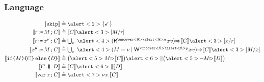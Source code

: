 \documentclass[t,aspectratio=169]{beamer} %
\begin{document}
\begin{frame}
  \frametitle{Language}
  \begin{gather*}
    \begin{aligned}
      \sem[\aThrd]{\SKIP} & \eqdef
      \alert<2>{\{ \DSTOP \}}
      \\
      \sem[\aThrd]{\aReg\GETS\aExp\SEMI \aCmd} & \eqdef
      \sem[\aThrd]{\aCmd}\alert<3>{[\aExp/\aReg]}
      \\ 
      \sem{\aReg\GETS\aLoc^\amode\SEMI \aCmd} & \eqdef \textstyle\bigcup_\aVal\;
      \alert<4>{(\DR[\uncover<8>{\alert<8>{\amode}}]\aLoc\aVal)\prefix} \sem{\aCmd} \alert<3>{[\aLoc/\aReg]}
      \\
      \sem{\aLoc^\amode\GETS\aExp\SEMI \aCmd} & \eqdef
      \textstyle\bigcup_\aVal\; \alert<4>{(\aExp=\aVal \mid \DW[\uncover<8>{\alert<8>{\amode}}]\aLoc\aVal)\prefix} \sem{\aCmd}\alert<3>{[\aExp/\aLoc]}
      \\
      \sem[\aThrd]{\IF{\aExp} \THEN \aCmd \ELSE \bCmd \FI} & \eqdef
      \bigl(\alert<5>{\aExp \guard} \sem[\aThrd]{\aCmd}\bigr) \alert<6>{\parallel} \bigl(\alert<5>{\lnot\aExp \guard} \sem[\aThrd]{\bCmd}\bigr) 
      \\
      \sem[\aThrd]{\aCmd \PAR[\bThrd][\bThrd'] \bCmd} & \eqdef
      \sem[\bThrd]{\aCmd} \alert<6>{\parallel} \sem[\bThrd']{\bCmd} 
      \\
      \sem[\aThrd]{\VAR\aLoc\SEMI \aCmd} & \eqdef
      \alert<7>{\nu \aLoc \DOT} \sem[\aThrd]{\aCmd}  
    \end{aligned}
  \end{gather*}
\end{frame}
\end{document}

